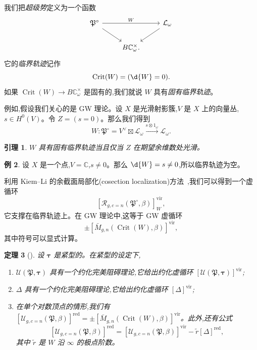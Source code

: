 \documentclass{amsart}
\newtheorem{thm}{定理}[section]
\newtheorem{lem}[thm]{引理}
\theoremstyle{definition}
\newtheorem{exm}[thm]{例}
\theoremstyle{remark}
\theoremstyle{plain}
\theoremstyle{definition}
\theoremstyle{remark}
\newcommand{\C}{\mathbb{C}}
\newcommand{\mc}[1]{\mathcal{#1}}
\newcommand{\mf}[1]{\mathfrak{#1}}
\newcommand{\mr}[1]{\mathrm{#1}}
\newcommand{\on}[1]{\operatorname{#1}}
\newcommand{\1}{\mathbf{1}}
\newcommand{\2}{\mathbf{2}}
\newcommand{\3}{\mathbf{3}}
\newcommand{\vir}{\mr{vir}}
\begin{document}
我们把\textit{超级势}定义为一个函数
\begin{equation*}
\begin{tikzcd}
    \mf{P}^{\circ} \ar{rr}{W} \ar{dr} && \mc{L}_{\omega} \ar{dl} \\
    & B \C_{\omega}^{\times}.
\end{tikzcd}
\end{equation*}
它的\textit{临界轨迹}记作
\[ \on{Crit}(W) = (\d{W} = 0). \]
如果 \(\on{Crit}(W) \to B\C_{\omega}^{\times}\) 是固有的,我们就说 \(W\) 具有\textit{固有临界轨迹}。

例如,假设我们关心的是 GW 理论。设 \(X\) 是光滑射影簇,\(V\) 是 \(X\) 上的向量丛,\(s \in H^0(V)\)。令 \(Z = (s = 0)\)。那么我们得到
\[ W \colon \mf{P}^{\circ} = V^{\vee} \boxtimes \mc{L}_{\omega} \xrightarrow{s \otimes 1_{\omega}} \mc{L}_{\omega}. \]

\begin{lem}
    \(W\) 具有固有临界轨迹当且仅当 \(Z\) 在期望余维数处光滑。
\end{lem}

\begin{exm}
    设 \(X\) 是一个点,\(V = \C\),\(s \neq 0\)。那么 \(\d{W} = s \neq 0\),所以临界轨迹为空。
\end{exm}

利用 Kiem--Li 的余截面局部化(cosection localization)方法~\cite{KiemLi2013},我们可以得到一个虚循环
\[ [\mc{R}_{g, c=n}(\mf{P}^{\circ}, \beta)]_W^{\vir}, \]
它支撑在临界轨迹上。在 GW 理论中,这等于 GW 虚循环
\[ \pm [\bar{M}_{g,n}(\on{Crit}(W), \beta)]^{\vir}, \]
其中符号可以显式计算。

\begin{thm}[{\cite{CJR2021,CJW2021}}]
    设 \(\bm{\tau}\) 是紧型的。在紧型的设定下,
    \begin{enumerate}
        \item \(\mc{U}(\mf{P}, \bm{\tau})\) 具有一个约化完美阻碍理论,它给出约化虚循环 \([\mc{U}(\mf{P}, \bm{\tau})]^{\vir}\);
        \item \(\Delta\) 具有一个约化完美阻碍理论,它给出约化虚循环 \([\Delta]^{\vir}\);
        \item 在单个对数顶点的情形,我们有 \([\mc{U}_{g, c=n}(\mf{P}, \beta)]^{\on{red}} = \pm [\bar{M}_{g,n}(\on{Crit}(W), \beta)]^{\vir}\)。此外,还有公式
            \[ [\mc{U}_{g, c=n}(\mf{P}, \beta)]^{\on{red}} = [\mc{U}_{g, c=n}(\mf{P}, \beta)]^{\vir} - \tilde{r} [\Delta]^{\on{red}}, \]
            其中 \(\tilde{r}\) 是 \(W\) 沿 \(\infty\) 的极点阶数。
    \end{enumerate}
\end{thm}
\end{document}
